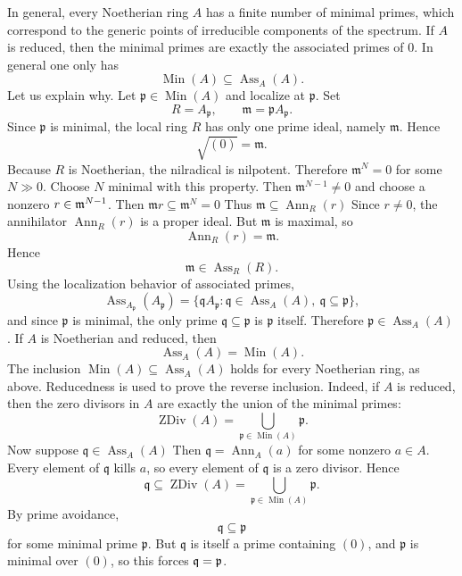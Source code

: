 \documentclass[12pt]{article}
\begin{document}
In general, every Noetherian ring $A$ has a finite number of minimal primes, which correspond to the generic points of irreducible components of the spectrum. If $A$ is reduced, then the minimal primes are exactly the associated primes of $0$. In general one only has
\[
    \operatorname{Min}(A) \subseteq \operatorname{Ass}_A(A).
\]
Let us explain why. Let $\mathfrak p \in \operatorname{Min}(A)$ and localize at $\mathfrak p$. Set
\[
    R = A_{\mathfrak p},
    \qquad
    \mathfrak m = \mathfrak p A_{\mathfrak p}.
\]
Since $\mathfrak p$ is minimal, the local ring $R$ has only one prime ideal, namely $\mathfrak m$. Hence
\[
    \sqrt{(0)} = \mathfrak m.
\]
Because $R$ is Noetherian, the nilradical is nilpotent. Therefore $\mathfrak m^N = 0$
for some $N \gg 0$. Choose $N$ minimal with this property. Then $\mathfrak m^{N-1} \neq 0$ and choose a nonzero $r\in \mathfrak{m}^{N-1}$.
Then $\mathfrak m r \subseteq \mathfrak m^N = 0$
Thus $\mathfrak m \subseteq \operatorname{Ann}_R(r)$
Since $r \neq 0$, the annihilator $\operatorname{Ann}_R(r)$ is a proper ideal. But $\mathfrak m$ is maximal, so
\[
    \operatorname{Ann}_R(r)=\mathfrak m.
\]
Hence
\[
    \mathfrak m \in \operatorname{Ass}_R(R).
\]
Using the localization behavior of associated primes,
\[
    \operatorname{Ass}_{A_{\mathfrak p}}(A_{\mathfrak p})
    =
    \{\mathfrak q A_{\mathfrak p} : \mathfrak q \in \operatorname{Ass}_A(A),\ \mathfrak q \subseteq \mathfrak p\},
\]
and since $\mathfrak p$ is minimal, the only prime $\mathfrak q \subseteq \mathfrak p$ is $\mathfrak p$ itself. Therefore $\mathfrak p \in \operatorname{Ass}_A(A)$.
If $A$ is Noetherian and reduced, then
\[
    \operatorname{Ass}_A(A)=\operatorname{Min}(A).
\]
The inclusion $\operatorname{Min}(A) \subseteq \operatorname{Ass}_A(A)$
holds for every Noetherian ring, as above. Reducedness is used to prove the reverse inclusion. Indeed, if $A$ is reduced, then the zero divisors in $A$ are exactly the union of the minimal primes:
\[
    \operatorname{ZDiv}(A)
    =
    \bigcup_{\mathfrak p \in \operatorname{Min}(A)} \mathfrak p.
\]
Now suppose $\mathfrak q \in \operatorname{Ass}_A(A)$
Then $\mathfrak q = \operatorname{Ann}_A(a)$
for some nonzero $a \in A$. Every element of $\mathfrak q$ kills $a$, so every element of $\mathfrak q$ is a zero divisor. Hence
\[
    \mathfrak q \subseteq \operatorname{ZDiv}(A)
    =
    \bigcup_{\mathfrak p \in \operatorname{Min}(A)} \mathfrak p.
\]
By prime avoidance,
\[
    \mathfrak q \subseteq \mathfrak p
\]
for some minimal prime $\mathfrak p$. But $\mathfrak q$ is itself a prime containing $(0)$, and $\mathfrak p$ is minimal over $(0)$, so this forces $\mathfrak{q} = \mathfrak{p}$.
\end{document}
